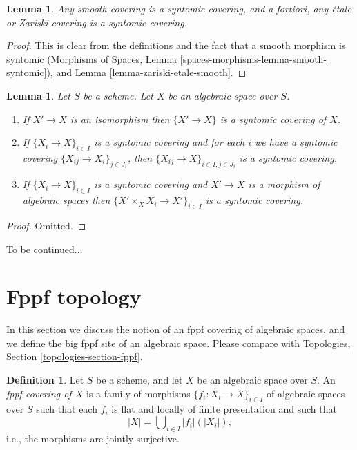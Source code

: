 \documentclass{stacks-project}
\theoremstyle{plain}
\newtheorem{lemma}[subsection]{Lemma}
\theoremstyle{definition}
\newtheorem{definition}[subsection]{Definition}
\theoremstyle{remark}
\numberwithin{equation}{subsection}
\begin{document}
\begin{lemma}
\label{lemma-zariski-etale-smooth-syntomic}
Any smooth covering is a syntomic covering, and a fortiori,
any \'etale or Zariski covering is a syntomic covering.
\end{lemma}

\begin{proof}
This is clear from the definitions and the fact that a smooth
morphism is syntomic
(Morphisms of Spaces, Lemma \ref{spaces-morphisms-lemma-smooth-syntomic}),
and Lemma \ref{lemma-zariski-etale-smooth}.
\end{proof}

\begin{lemma}
\label{lemma-syntomic}
Let $S$ be a scheme.
Let $X$ be an algebraic space over $S$.
\begin{enumerate}
\item If $X' \to X$ is an isomorphism then $\{X' \to X\}$
is a syntomic covering of $X$.
\item If $\{X_i \to X\}_{i\in I}$ is a syntomic covering and for each
$i$ we have a syntomic covering $\{X_{ij} \to X_i\}_{j\in J_i}$, then
$\{X_{ij} \to X\}_{i \in I, j\in J_i}$ is a syntomic covering.
\item If $\{X_i \to X\}_{i\in I}$ is a syntomic covering
and $X' \to X$ is a morphism of algebraic spaces then
$\{X' \times_X X_i \to X'\}_{i\in I}$ is a syntomic covering.
\end{enumerate}
\end{lemma}

\begin{proof}
Omitted.
\end{proof}

\noindent
To be continued...










\section{Fppf topology}
\label{section-fppf}

\noindent
In this section we discuss the notion of an fppf covering of algebraic spaces,
and we define the big fppf site of an algebraic space. Please compare with
Topologies, Section \ref{topologies-section-fppf}.

\begin{definition}
\label{definition-fppf-covering}
Let $S$ be a scheme, and let $X$ be an algebraic space over $S$.
An {\it fppf covering of $X$} is a family of morphisms
$\{f_i : X_i \to X\}_{i \in I}$ of algebraic spaces over $S$
such that each $f_i$ is flat and locally of finite presentation
and such that
$$
|X| = \bigcup\nolimits_{i \in I} |f_i|(|X_i|),
$$
i.e., the morphisms are jointly surjective.
\end{definition}
\end{document}

